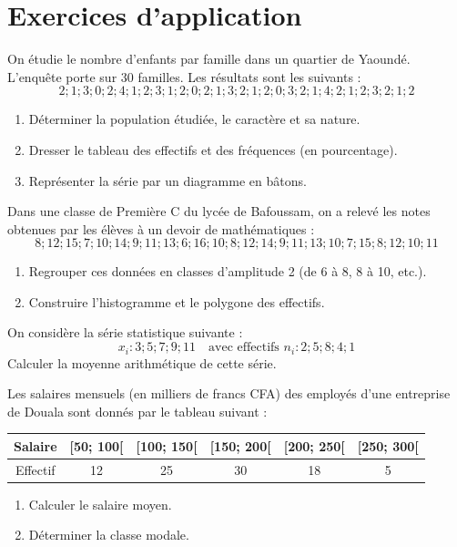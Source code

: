 \section{Exercices d'application}


\exo{}
On étudie le nombre d'enfants par famille dans un quartier de Yaoundé. L'enquête porte sur 30 familles. Les résultats sont les suivants :
\[
2; 1; 3; 0; 2; 4; 1; 2; 3; 1; 2; 0; 2; 1; 3; 2; 1; 2; 0; 3; 2; 1; 4; 2; 1; 2; 3; 2; 1; 2
\]
\begin{enumerate}[label=\alph*)]
\item Déterminer la population étudiée, le caractère et sa nature.
\item Dresser le tableau des effectifs et des fréquences (en pourcentage).
\item Représenter la série par un diagramme en bâtons.
\end{enumerate}

\exo{}
Dans une classe de Première C du lycée de Bafoussam, on a relevé les notes obtenues par les élèves à un devoir de mathématiques :
\[
8; 12; 15; 7; 10; 14; 9; 11; 13; 6; 16; 10; 8; 12; 14; 9; 11; 13; 10; 7; 15; 8; 12; 10; 11
\]
\begin{enumerate}[label=\alph*)]
\item Regrouper ces données en classes d'amplitude 2 (de 6 à 8, 8 à 10, etc.).
\item Construire l'histogramme et le polygone des effectifs.
\end{enumerate}


\exo{}
On considère la série statistique suivante :
\[
x_i : 3; 5; 7; 9; 11 \quad \text{avec effectifs } n_i : 2; 5; 8; 4; 1
\]
Calculer la moyenne arithmétique de cette série.

\exo{}
Les salaires mensuels (en milliers de francs CFA) des employés d'une entreprise de Douala sont donnés par le tableau suivant :
\begin{center}
\begin{tabular}{|c|c|c|c|c|c|}
\hline
Salaire & [50; 100[ & [100; 150[ & [150; 200[ & [200; 250[ & [250; 300[ \\
\hline
Effectif & 12 & 25 & 30 & 18 & 5 \\
\hline
\end{tabular}
\end{center}
\begin{enumerate}[label=\alph*)]
\item Calculer le salaire moyen.
\item Déterminer la classe modale.
\end{enumerate}

